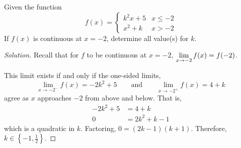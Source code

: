 \question Given the function \begin{equation*}
  f(x) = \begin{cases}
    k^2x+5 & x \leq -2 \\
    x^2+k  & x > -2
  \end{cases}
\end{equation*}
If $f(x)$ is continuous at $x=-2$, determine all value(s) for $k$. %
\begin{proof}[Solution]
  Recall that for $f$ to be continuous at $x=-2$, $\displaystyle\lim_{x\to-2}f(x)=f(-2)$.

  This limit exists if and only if the one-sided limits,
  \[ \lim_{x\to-2^-}f(x) = -2k^2+5 \qquad \text{and} \qquad \lim_{x\to-2^+}f(x) = 4+k \]
  agree as $x$ approaches $-2$ from above and below. That is,
  \begin{align*}
    -2k^2 + 5 & = 4 + k        \\
    0         & = 2k^2 + k - 1
  \end{align*}
  which is a quadratic in $k$.
  Factoring, $0 = (2k-1)(k+1)$.
  Therefore, $k \in \left\{-1,\frac12\right\}$.
\end{proof}

